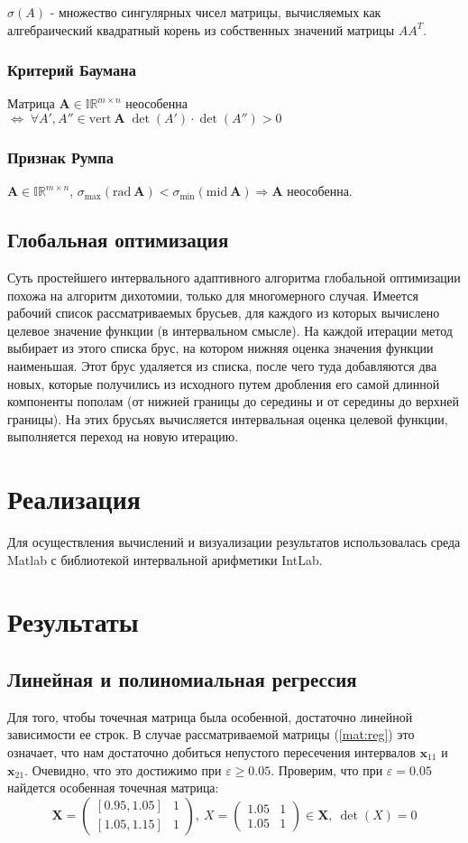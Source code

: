 \documentclass[a4paper]{article}
\begin{document}
$\sigma(A)$ - множество сингулярных чисел матрицы, вычисляемых как алгебраический квадратный корень из собственных значений матрицы $AA^T$.
\subsubsection{Критерий Баумана}
Матрица $\mathbf{A}\in\mathbb{IR}^{m\times n}$ неособенна $\Leftrightarrow\;\forall A',A''\in\mathrm{vert}\:\mathbf{A}\;\det(A')\cdot\det(A'')>0$ 
\subsubsection{Признак Румпа}
$\mathbf{A}\in\mathbb{IR}^{m\times n}$, $\sigma_{\mathrm{max}}(\mathrm{rad}\:\mathbf{A})<\sigma_{\mathrm{min}}(\mathrm{mid}\:\mathbf{A})\Rightarrow\mathbf{A}$ неособенна.
\subsection{Глобальная оптимизация}
Суть простейшего интервального адаптивного алгоритма глобальной оптимизации похожа на алгоритм дихотомии, только для многомерного случая. Имеется рабочий список рассматриваемых брусьев, для каждого из которых вычислено целевое значение функции (в интервальном смысле). На каждой итерации метод выбирает из этого списка брус, на котором нижняя оценка значения функции наименьшая. Этот брус удаляется из списка, после чего туда добавляются два новых, которые получились из исходного путем дробления его самой длинной компоненты пополам (от нижней границы до середины и от середины до верхней границы). На этих брусьях вычисляется интервальная оценка целевой функции, выполняется переход на новую итерацию.
\section{Реализация}
Для осуществления вычислений и визуализации результатов использовалась среда Matlab с библиотекой интервальной арифметики IntLab.
\section{Результаты}
\subsection{Линейная и полиномиальная регрессия}
Для того, чтобы точечная матрица была особенной, достаточно линейной зависимости ее строк. В случае рассматриваемой матрицы (\ref{mat:reg}) это означает, что нам достаточно добиться непустого пересечения интервалов $\mathbf{x}_{1 1}$ и $\mathbf{x}_{2 1}$. Очевидно, что это достижимо при $\varepsilon\geq0.05$. Проверим, что при $\varepsilon=0.05$ найдется особенная точечная матрица:
\begin{equation*}
    \mathbf{X}=\begin{pmatrix}
  [0.95,1.05]& 1\\
  [1.05,1.15]& 1
\end{pmatrix},\: X=\begin{pmatrix}
  1.05& 1\\
  1.05& 1
\end{pmatrix}\in\mathbf{X},\:\det(X)=0
\end{equation*}
\end{document}
